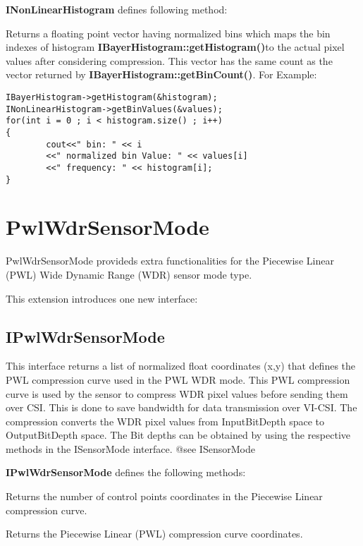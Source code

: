\documentclass[11pt]{article}
\newcommand{\classname}[1]{\textbf{#1}}
\newcommand{\methodname}[1]{\textbf{#1}}
\begin{document}
\classname{INonLinearHistogram} defines following method:
\begin{description}[style=nextline,align=left,leftmargin=4em]
\item[getHistogramBinValues()] Returns a floating point vector having normalized bins which maps
the bin indexes of histogram \methodname{IBayerHistogram::getHistogram()}to the actual pixel
values after considering compression. This vector has the same count as the vector returned by
\methodname{IBayerHistogram::getBinCount()}.
For Example:

\begin{lstlisting}
IBayerHistogram->getHistogram(&histogram);
INonLinearHistogram->getBinValues(&values);
for(int i = 0 ; i < histogram.size() ; i++)
{
        cout<<" bin: " << i
        <<" normalized bin Value: " << values[i]
        <<" frequency: " << histogram[i];
}
\end{lstlisting}
\end{description}

\section{PwlWdrSensorMode}

PwlWdrSensorMode provideds extra functionalities for the Piecewise Linear (PWL)
Wide Dynamic Range (WDR) sensor mode type.

This extension introduces one new interface:
\subsection{IPwlWdrSensorMode} This interface returns a list of normalized float coordinates (x,y)
that defines the PWL compression curve used in the PWL WDR mode.
This PWL compression curve is used by the sensor to compress WDR pixel values before sending
them over CSI. This is done to save bandwidth for data transmission over
VI-CSI. The compression converts the WDR pixel values from InputBitDepth
space to OutputBitDepth space. The Bit depths can be
obtained by using the respective methods in the ISensorMode interface.
@see ISensorMode

\classname{IPwlWdrSensorMode} defines the following methods:
\begin{description}[style=nextline,align=left,leftmargin=4em]
\item[getControlPointCount()] Returns the number of control points coordinates in the
Piecewise Linear compression curve.
\item[getControlPoints()] Returns the Piecewise Linear (PWL) compression curve coordinates.
\end{description}
\end{document}
